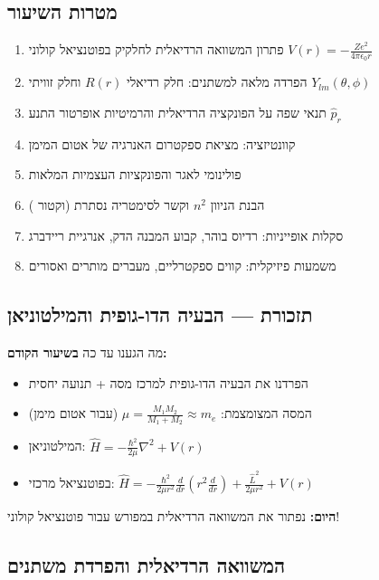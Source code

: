 \subsection*{מטרות השיעור}

\begin{enumerate}
    \item פתרון המשוואה הרדיאלית לחלקיק בפוטנציאל קולוני $V(r) = -\frac{Ze^2}{4\pi\epsilon_0 r}$
    \item הפרדה מלאה למשתנים: חלק רדיאלי $R(r)$ וחלק זוויתי $Y_{lm}(\theta,\phi)$
    \item תנאי שפה על הפונקציה הרדיאלית והרמיטיות אופרטור התנע $\hat{p}_r$
    \item קוונטיזציה: מציאת ספקטרום האנרגיה של אטום המימן
    \item פולינומי לאגר והפונקציות העצמיות המלאות
    \item הבנת הניוון $n^2$ וקשר לסימטריה נסתרת (וקטור )
    \item סקלות אופייניות: רדיוס בוהר, קבוע המבנה הדק, אנרגיית ריידברג
    \item משמעות פיזיקלית: קווים ספקטרליים, מעברים מותרים ואסורים
\end{enumerate}

\subsection*{תזכורת — הבעיה הדו-גופית והמילטוניאן}

\begin{summarybox}{מה הגענו עד כה}
\textbf{בשיעור הקודם:}
\begin{itemize}
    \item הפרדנו את הבעיה הדו-גופית למרכז מסה + תנועה יחסית
    \item המסה המצומצמת: $\mu = \frac{M_1 M_2}{M_1 + M_2} \approx m_e$ (עבור אטום מימן)
    \item המילטוניאן: $\hat{H} = -\frac{\hbar^2}{2\mu}\nabla^2 + V(r)$
    \item בפוטנציאל מרכזי: $\hat{H} = -\frac{\hbar^2}{2\mu r^2}\frac{d}{dr}\left(r^2\frac{d}{dr}\right) + \frac{\hat{L}^2}{2\mu r^2} + V(r)$
\end{itemize}

\textbf{היום:} נפתור את המשוואה הרדיאלית במפורש עבור פוטנציאל קולוני!
\end{summarybox}

\subsection{המשוואה הרדיאלית והפרדת משתנים}

